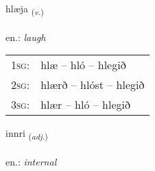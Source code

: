 \documentclass[frontgrid, backgrid]{flacards}\usepackage[]{graphicx}\usepackage[]{xcolor}
\begin{document}
\renewcommand{\flhead}{\vskip5pt \fboxsep=0pt {\small\bfseries\footnotesize Sagnorð | Verb}}
\renewcommand{\fcfoot}{\vskip5pt \fboxsep=0pt \hspace{2pt}{\small\bfseries\footnotesize 2K}}

\renewcommand{\blhead}{\vskip5pt {\small\bfseries\footnotesize Sagnorð | Verb }}
\renewcommand{\bcfoot}{\vskip5pt \hspace{2pt}{\small\bfseries\footnotesize 2K}}


{hlæja \small{\textsubscript{(\textit{v.})}} \\[1ex] %
\textphonetic{[l̥aiːja]} \\
en.: \emph{laugh} \\  [2ex]
\renewcommand*{\arraystretch}{0.8}
\begin{tabular}{p{1cm}l}
\textsc{1sg}: & hlæ -- hló -- hlegið \\ 
\textsc{2sg}: & hlærð -- hlóst -- hlegið \\ 
\textsc{3sg}: & hlær -- hló -- hlegið \\ 
\end{tabular}
}

\renewcommand{\flhead}{\vskip5pt \fboxsep=0pt {\small\bfseries\footnotesize Lýsingarorð | Adjective}}
\renewcommand{\fcfoot}{\vskip5pt \fboxsep=0pt \hspace{2pt}{\small\bfseries\footnotesize 2K}}

\renewcommand{\blhead}{\vskip5pt {\small\bfseries\footnotesize Lýsingarorð | Adjective }}
\renewcommand{\bcfoot}{\vskip5pt \hspace{2pt}{\small\bfseries\footnotesize 2K}}


{innri \small{\textsubscript{(\textit{adj.})}} \\[1ex] %
\textphonetic{[ɪnrɪ]} \\
en.: \emph{internal} \\  [2ex]
\renewcommand*{\arraystretch}{0.8}
}
\end{document}
